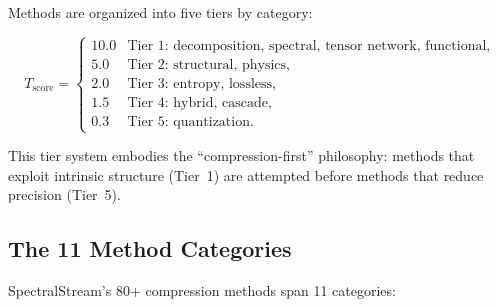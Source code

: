 \documentclass[11pt,a4paper,openright]{book}
\begin{document}
Methods are organized into five tiers by category:

\begin{equation}
	\label{eq:tiers}
	T_\text{score} =
	\begin{cases}
		10.0 & \text{Tier~1: decomposition, spectral, tensor network, functional}, \\
		5.0  & \text{Tier~2: structural, physics},                                 \\
		2.0  & \text{Tier~3: entropy, lossless},                                   \\
		1.5  & \text{Tier~4: hybrid, cascade},                                     \\
		0.3  & \text{Tier~5: quantization}.
	\end{cases}
\end{equation}

This tier system embodies the ``compression-first'' philosophy: methods that exploit intrinsic structure (Tier~1) are attempted before methods that reduce precision (Tier~5).

\subsection{The 11 Method Categories}

SpectralStream's 80+ compression methods span 11 categories:
\end{document}
